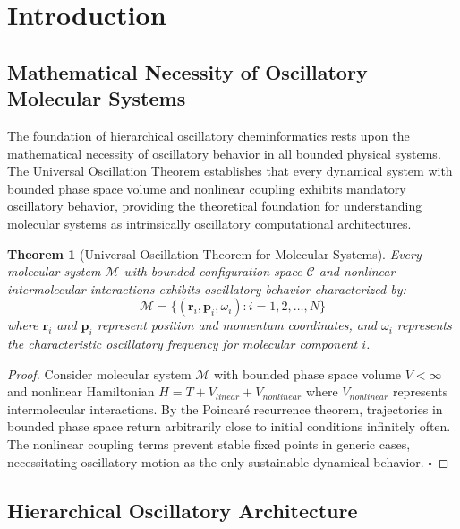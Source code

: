 \documentclass[12pt,a4paper]{article}
\newtheorem{theorem}{Theorem}[section]
\begin{document}
\section{Introduction}

\subsection{Mathematical Necessity of Oscillatory Molecular Systems}

The foundation of hierarchical oscillatory cheminformatics rests upon the mathematical necessity of oscillatory behavior in all bounded physical systems. The Universal Oscillation Theorem establishes that every dynamical system with bounded phase space volume and nonlinear coupling exhibits mandatory oscillatory behavior, providing the theoretical foundation for understanding molecular systems as intrinsically oscillatory computational architectures.

\begin{theorem}[Universal Oscillation Theorem for Molecular Systems]
Every molecular system $\mathcal{M}$ with bounded configuration space $\mathcal{C}$ and nonlinear intermolecular interactions exhibits oscillatory behavior characterized by:
\begin{equation}
\mathcal{M} = \{(\mathbf{r}_i, \mathbf{p}_i, \omega_i) : i = 1, 2, \ldots, N\}
\end{equation}
where $\mathbf{r}_i$ and $\mathbf{p}_i$ represent position and momentum coordinates, and $\omega_i$ represents the characteristic oscillatory frequency for molecular component $i$.
\end{theorem}

\begin{proof}
Consider molecular system $\mathcal{M}$ with bounded phase space volume $V < \infty$ and nonlinear Hamiltonian $H = T + V_{linear} + V_{nonlinear}$ where $V_{nonlinear}$ represents intermolecular interactions. By the Poincaré recurrence theorem, trajectories in bounded phase space return arbitrarily close to initial conditions infinitely often. The nonlinear coupling terms prevent stable fixed points in generic cases, necessitating oscillatory motion as the only sustainable dynamical behavior. $\square$
\end{proof}

\subsection{Hierarchical Oscillatory Architecture}
\end{document}
